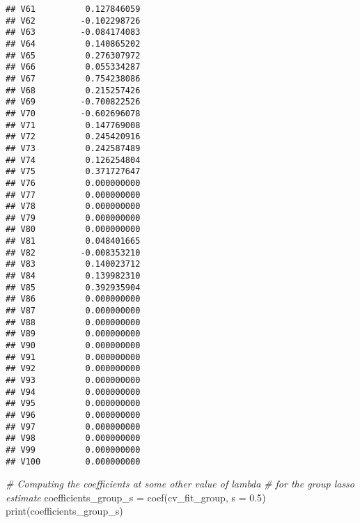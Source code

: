 \documentclass[
]{book}
\newenvironment{Shaded}{\begin{snugshade}}{\end{snugshade}}
\newcommand{\AttributeTok}[1]{\textcolor[rgb]{0.77,0.63,0.00}{#1}}
\newcommand{\CommentTok}[1]{\textcolor[rgb]{0.56,0.35,0.01}{\textit{#1}}}
\newcommand{\FloatTok}[1]{\textcolor[rgb]{0.00,0.00,0.81}{#1}}
\newcommand{\FunctionTok}[1]{\textcolor[rgb]{0.00,0.00,0.00}{#1}}
\newcommand{\NormalTok}[1]{#1}
\newcommand{\OtherTok}[1]{\textcolor[rgb]{0.56,0.35,0.01}{#1}}
\begin{document}
\begin{verbatim}
## V61          0.127846059
## V62         -0.102298726
## V63         -0.084174083
## V64          0.140865202
## V65          0.276307972
## V66          0.055334287
## V67          0.754238086
## V68          0.215257426
## V69         -0.700822526
## V70         -0.602696078
## V71          0.147769008
## V72          0.245420916
## V73          0.242587489
## V74          0.126254804
## V75          0.371727647
## V76          0.000000000
## V77          0.000000000
## V78          0.000000000
## V79          0.000000000
## V80          0.000000000
## V81          0.048401665
## V82         -0.008353210
## V83          0.140023712
## V84          0.139982310
## V85          0.392935904
## V86          0.000000000
## V87          0.000000000
## V88          0.000000000
## V89          0.000000000
## V90          0.000000000
## V91          0.000000000
## V92          0.000000000
## V93          0.000000000
## V94          0.000000000
## V95          0.000000000
## V96          0.000000000
## V97          0.000000000
## V98          0.000000000
## V99          0.000000000
## V100         0.000000000
\end{verbatim}

\begin{Shaded}
\begin{Highlighting}[]
\CommentTok{\# Computing the coefficients at some other value of lambda}
\CommentTok{\# for the group lasso estimate}
\NormalTok{coefficients\_group\_s }\OtherTok{=} \FunctionTok{coef}\NormalTok{(cv\_fit\_group, }\AttributeTok{s =} \FloatTok{0.5}\NormalTok{)}
\FunctionTok{print}\NormalTok{(coefficients\_group\_s)}
\end{Highlighting}
\end{Shaded}
\end{document}
